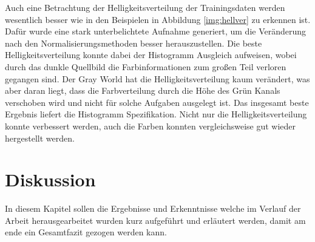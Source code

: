 \documentclass[a4paper,12pt,oneside]{article}
\begin{document}
Auch eine Betrachtung der Helligkeitsverteilung der Trainingsdaten werden wesentlich besser wie in den Beispielen in Abbildung \ref{img:hellver} zu erkennen ist. Dafür wurde eine stark unterbelichtete Aufnahme generiert, um die Veränderung nach den Normalisierungsmethoden besser herauszustellen. Die beste Helligkeitsverteilung konnte dabei der Histogramm Ausgleich aufweisen, wobei durch das dunkle Quellbild die Farbinformationen zum großen Teil verloren gegangen sind. Der Gray World hat die Helligkeitsverteilung kaum verändert, was aber daran liegt, dass die Farbverteilung durch die Höhe des Grün Kanals verschoben wird und nicht für solche Aufgaben ausgelegt ist. Das insgesamt beste Ergebnis liefert die Histogramm Spezifikation. Nicht nur die Helligkeitsverteilung konnte verbessert werden, auch die Farben konnten vergleichsweise gut wieder hergestellt werden.
  \newpage
\section{Diskussion}\label{s.diskussion}
In diesem Kapitel sollen die Ergebnisse und Erkenntnisse welche im Verlauf der Arbeit herausgearbeitet wurden kurz aufgeführt und erläutert werden, damit am ende ein Gesamtfazit gezogen werden kann.
\end{document}
